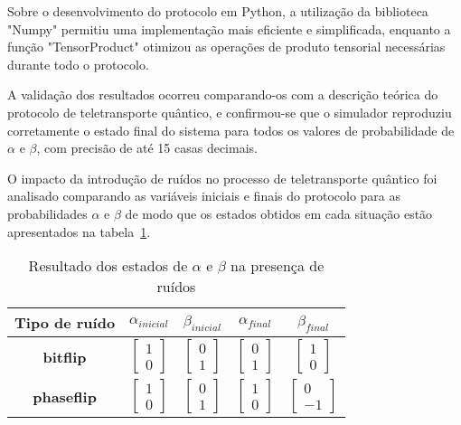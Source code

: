 Sobre o desenvolvimento do protocolo em Python, a utilização da biblioteca "Numpy" permitiu uma implementação mais eficiente e simplificada, enquanto a função "TensorProduct" otimizou as operações de produto tensorial necessárias durante todo o protocolo.

A validação dos resultados ocorreu comparando-os com a descrição teórica do protocolo de teletransporte quântico, e confirmou-se que o simulador reproduziu corretamente o estado final do sistema para todos os valores de probabilidade de $\alpha$ e $\beta$, com precisão de até 15 casas decimais.

O impacto da introdução de ruídos no processo de teletransporte quântico foi analisado comparando as variáveis iniciais e finais do protocolo para as probabilidades $\alpha$ e $\beta$ de modo que os estados obtidos em cada situação estão apresentados na tabela~\ref{tab:resultadoruidos}.

\begin{table}[ht!]
  \centering
  \caption{Resultado dos estados de $\alpha$ e $\beta$ na presença de ruídos}\label{tab:resultadoruidos}
  \begin{tabular}{ccccc}
    \toprule
   		 \textbf{Tipo de ruído} & \textbf{$\alpha_{inicial}$} & \textbf{$\beta_{inicial}$} & \textbf{$\alpha_{final}$} & \textbf{$\beta_{final}$} \\
   		 \midrule
   			 \textbf{bitflip} & $\begin{bmatrix} 1 \\ 0 \end{bmatrix}$ & $\begin{bmatrix} 0 \\ 1 \end{bmatrix}$ & $\begin{bmatrix} 0 \\ 1 \end{bmatrix}$ & $\begin{bmatrix} 1 \\ 0 \end{bmatrix}$ \\
    			\textbf{phaseflip} & $\begin{bmatrix} 1 \\ 0 \end{bmatrix}$ & $\begin{bmatrix} 0 \\ 1 \end{bmatrix}$ & $\begin{bmatrix} 1 \\ 0 \end{bmatrix}$ & $\begin{bmatrix} 0 \\ -1 \end{bmatrix}$   
  \end{tabular}
\end{table}

